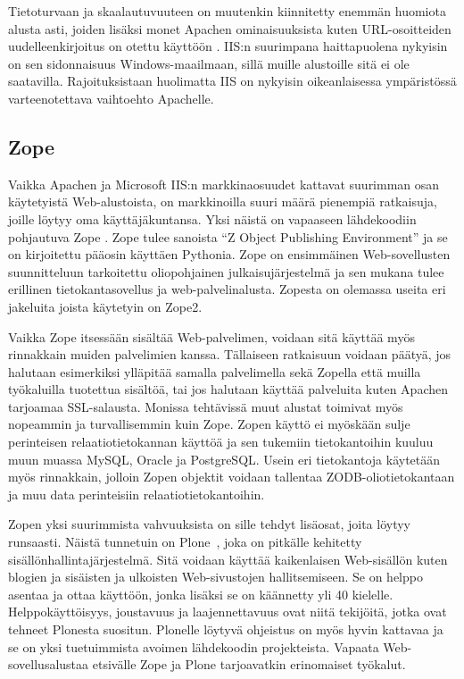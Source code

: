 Tietoturvaan ja skaalautuvuuteen on muutenkin kiinnitetty enemmän huomiota alusta asti, joiden lisäksi monet Apachen ominaisuuksista
kuten URL-osoitteiden uudelleenkirjoitus on otettu käyttöön \cite{IIS}. IIS:n suurimpana haittapuolena nykyisin on sen sidonnaisuus Windows-maailmaan, sillä muille alustoille sitä ei ole 
saatavilla. Rajoituksistaan huolimatta IIS on nykyisin oikeanlaisessa ympäristössä varteenotettava vaihtoehto Apachelle. 

\subsection{Zope}

Vaikka Apachen ja Microsoft IIS:n markkinaosuudet kattavat suurimman osan käytetyistä Web-alustoista, on markkinoilla suuri määrä pienempiä ratkaisuja, joille löytyy oma käyttäjäkuntansa. Yksi 
näistä on vapaaseen lähdekoodiin pohjautuva Zope \cite{Zope}. Zope tulee sanoista ``Z Object Publishing Environment'' ja se on kirjoitettu pääosin käyttäen Pythonia. Zope on ensimmäinen
Web-sovellusten suunnitteluun tarkoitettu oliopohjainen julkaisujärjestelmä ja sen mukana tulee erillinen tietokantasovellus ja web-palvelinalusta. Zopesta on olemassa useita eri jakeluita
joista käytetyin on Zope2. 

Vaikka Zope itsessään sisältää Web-palvelimen, voidaan sitä käyttää myös rinnakkain muiden palvelimien kanssa. Tällaiseen ratkaisuun voidaan päätyä, jos halutaan esimerkiksi ylläpitää samalla
palvelimella sekä Zopella että muilla työkaluilla tuotettua sisältöä,
tai jos halutaan käyttää palveluita kuten Apachen tarjoamaa SSL-salausta. Monissa tehtävissä muut alustat toimivat myös nopeammin ja 
turvallisemmin kuin Zope. Zopen käyttö ei myöskään sulje perinteisen
relaatiotietokannan käyttöä ja sen tukemiin tietokantoihin kuuluu
muun muassa MySQL, Oracle ja PostgreSQL. Usein eri 
tietokantoja käytetään myös rinnakkain, jolloin Zopen objektit voidaan tallentaa ZODB-oliotietokantaan ja muu data perinteisiin relaatiotietokantoihin. 

Zopen yksi suurimmista vahvuuksista on sille tehdyt lisäosat, joita löytyy runsaasti. Näistä tunnetuin on Plone~\cite{Plone}, joka on pitkälle kehitetty 
sisällönhallintajärjestelmä. Sitä voidaan käyttää kaikenlaisen Web-sisällön kuten blogien ja sisäisten ja ulkoisten Web-sivustojen hallitsemiseen. Se on helppo asentaa ja ottaa käyttöön, 
jonka lisäksi se on käännetty yli 40 kielelle. Helppokäyttöisyys, joustavuus ja laajennettavuus ovat niitä tekijöitä, jotka ovat tehneet Plonesta suositun. Plonelle löytyvä ohjeistus
on myös hyvin kattavaa ja se on yksi tuetuimmista avoimen lähdekoodin projekteista. Vapaata Web-sovellusalustaa etsivälle Zope ja Plone tarjoavatkin erinomaiset työkalut.

